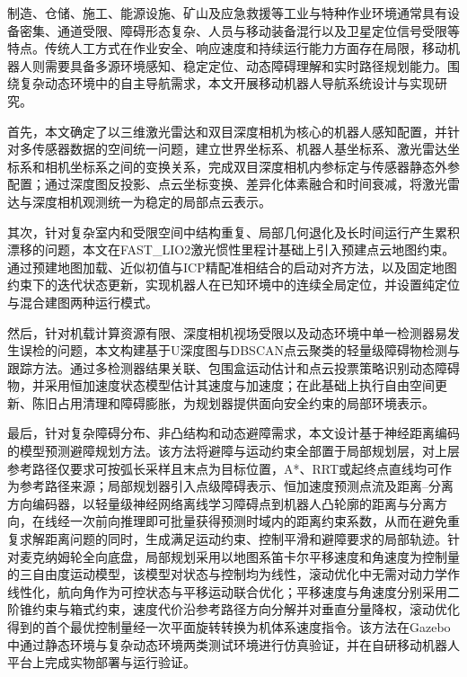 
\cnabstract
制造、仓储、施工、能源设施、矿山及应急救援等工业与特种作业环境通常具有设备密集、通道受限、障碍形态复杂、人员与移动装备混行以及卫星定位信号受限等特点。传统人工方式在作业安全、响应速度和持续运行能力方面存在局限，移动机器人则需要具备多源环境感知、稳定定位、动态障碍理解和实时路径规划能力。围绕复杂动态环境中的自主导航需求，本文开展移动机器人导航系统设计与实现研究。

首先，本文确定了以三维激光雷达和双目深度相机为核心的机器人感知配置，并针对多传感器数据的空间统一问题，建立世界坐标系、机器人基坐标系、激光雷达坐标系和相机坐标系之间的变换关系，完成双目深度相机内参标定与传感器静态外参配置；通过深度图反投影、点云坐标变换、差异化体素融合和时间衰减，将激光雷达与深度相机观测统一为稳定的局部点云表示。

其次，针对复杂室内和受限空间中结构重复、局部几何退化及长时间运行产生累积漂移的问题，本文在FAST\_LIO2激光惯性里程计基础上引入预建点云地图约束。通过预建地图加载、近似初值与ICP精配准相结合的启动对齐方法，以及固定地图约束下的迭代状态更新，实现机器人在已知环境中的连续全局定位，并设置纯定位与混合建图两种运行模式。

然后，针对机载计算资源有限、深度相机视场受限以及动态环境中单一检测器易发生误检的问题，本文构建基于U深度图与DBSCAN点云聚类的轻量级障碍物检测与跟踪方法。通过多检测器结果关联、包围盒运动估计和点云投票策略识别动态障碍物，并采用恒加速度状态模型估计其速度与加速度；在此基础上执行自由空间更新、陈旧占用清理和障碍膨胀，为规划器提供面向安全约束的局部环境表示。

最后，针对复杂障碍分布、非凸结构和动态避障需求，本文设计基于神经距离编码的模型预测避障规划方法。该方法将避障与运动约束全部置于局部规划层，对上层参考路径仅要求可按弧长采样且末点为目标位置，A*、RRT或起终点直线均可作为参考路径来源；局部规划器引入点级障碍表示、恒加速度预测点流及距离--分离方向编码器，以轻量级神经网络离线学习障碍点到机器人凸轮廓的距离与分离方向，在线经一次前向推理即可批量获得预测时域内的距离约束系数，从而在避免重复求解距离问题的同时，生成满足运动约束、控制平滑和避障要求的局部轨迹。针对麦克纳姆轮全向底盘，局部规划采用以地图系笛卡尔平移速度和角速度为控制量的三自由度运动模型，该模型对状态与控制均为线性，滚动优化中无需对动力学作线性化，航向角作为可控状态与平移运动联合优化；平移速度与角速度分别采用二阶锥约束与箱式约束，速度代价沿参考路径方向分解并对垂直分量降权，滚动优化得到的首个最优控制量经一次平面旋转转换为机体系速度指令。该方法在Gazebo中通过静态环境与复杂动态环境两类测试环境进行仿真验证，并在自研移动机器人平台上完成实物部署与运行验证。

